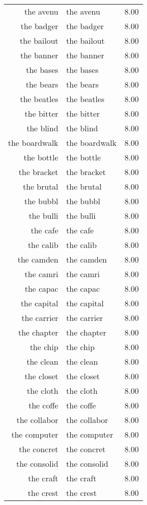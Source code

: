 \begin{table}[ht]
\begin{tabular}{rlr}
  the avenu & the avenu & 8.00 \\ 
  the badger & the badger & 8.00 \\ 
  the bailout & the bailout & 8.00 \\ 
  the banner & the banner & 8.00 \\ 
  the bases & the bases & 8.00 \\ 
  the bears & the bears & 8.00 \\ 
  the beatles & the beatles & 8.00 \\ 
  the bitter & the bitter & 8.00 \\ 
  the blind & the blind & 8.00 \\ 
  the boardwalk & the boardwalk & 8.00 \\ 
  the bottle & the bottle & 8.00 \\ 
  the bracket & the bracket & 8.00 \\ 
  the brutal & the brutal & 8.00 \\ 
  the bubbl & the bubbl & 8.00 \\ 
  the bulli & the bulli & 8.00 \\ 
  the cafe & the cafe & 8.00 \\ 
  the calib & the calib & 8.00 \\ 
  the camden & the camden & 8.00 \\ 
  the camri & the camri & 8.00 \\ 
  the capac & the capac & 8.00 \\ 
  the capital & the capital & 8.00 \\ 
  the carrier & the carrier & 8.00 \\ 
  the chapter & the chapter & 8.00 \\ 
  the chip & the chip & 8.00 \\ 
  the clean & the clean & 8.00 \\ 
  the closet & the closet & 8.00 \\ 
  the cloth & the cloth & 8.00 \\ 
  the coffe & the coffe & 8.00 \\ 
  the collabor & the collabor & 8.00 \\ 
  the computer & the computer & 8.00 \\ 
  the concret & the concret & 8.00 \\ 
  the consolid & the consolid & 8.00 \\ 
  the craft & the craft & 8.00 \\ 
  the crest & the crest & 8.00 \\ 

\end{tabular}
\end{table}
